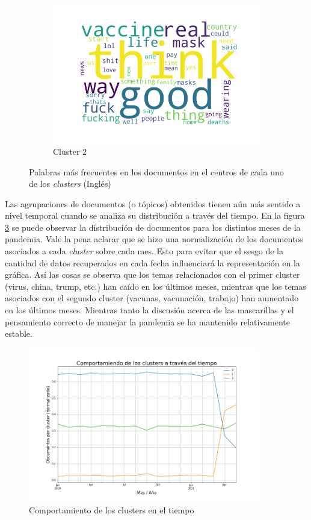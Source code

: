 \begin{figure}
\begin{subfigure}[b]{0.49\textwidth}
        \includegraphics[width=\textwidth]{results/TopicDetection/en/cluster1.png}
        \caption{Cluster 2}
        \label{fig:en_c1}
    \end{subfigure}
    \caption{Palabras más frecuentes en los documentos en el centros de cada uno de los \textit{clusters} (Inglés)}
    \label{fig:en_clusters}
\end{figure}

Las agrupaciones de documentos (o tópicos) obtenidos tienen aún más sentido a nivel temporal cuando se analiza su distribución a través del tiempo. En la figura \ref{fig:en_time} se puede observar la distribución de documentos para los distintos meses de la pandemia. Vale la pena aclarar que se hizo una normalización de los documentos asociados a cada \textit{cluster} sobre cada mes. Esto para evitar que el sesgo de la cantidad de datos recuperados en cada fecha influenciará la representación en la gráfica. Así las cosas se observa que los temas relacionados con el primer cluster (virus, china, trump, etc.) han caído en los últimos meses, mientras que los temas asociados con el segundo cluster (vacunas, vacunación, trabajo) han aumentado en los últimos meses. Mientras tanto la discusión acerca de las mascarillas y el pensamiento correcto de manejar la pandemia se ha mantenido relativamente estable.

\begin{figure}
    \centering
    \includegraphics[width=0.9\textwidth]{results/TopicDetection/en/cluster_over_time.png}
    \caption{Comportamiento de los clusters en el tiempo}
    \label{fig:en_time}
\end{figure}


